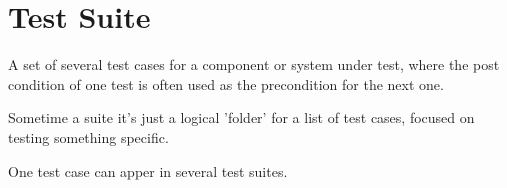 \section{Test Suite}
\label{sec:Test Suite}

A set of several test cases for a component or system under test, where the post condition of one test is often used as the precondition for the next one.

Sometime a suite it's just a logical 'folder' for a list of test cases, focused on testing something specific.

One test case can apper in several test suites.
